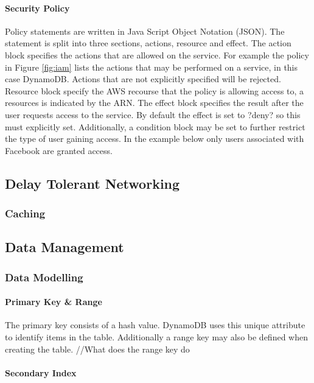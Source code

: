 \documentclass[a4paper, 11pt]{article}
\begin{document}
\paragraph{Security Policy}Policy statements are written in Java Script Object Notation (JSON). The statement is split into three sections, actions, resource and effect. The action block specifies the actions that are allowed on the service. For example the policy in Figure \ref{fig:iam} lists the actions that may be performed on a service, in this case DynamoDB. Actions that are not explicitly specified will be rejected. Resource block specify the AWS recourse that the policy is allowing access to, a resources is indicated by the ARN. The effect block specifies the result after the user requests access to the service. By default the effect is set to ?deny? so this must explicitly set. Additionally, a condition block may be set to further restrict the type of user gaining access. In the example below only users associated with Facebook are granted access.

\subsection{Delay Tolerant Networking}
\subsubsection{Caching}

\subsection{Data Management}

\subsubsection{Data Modelling}
\paragraph{Primary Key \& Range}
The primary key consists of a hash value. DynamoDB uses this unique attribute to identify items in the table. Additionally a range key may also be defined when creating the table. //What does the range key do

\paragraph{Secondary Index}
\end{document}
